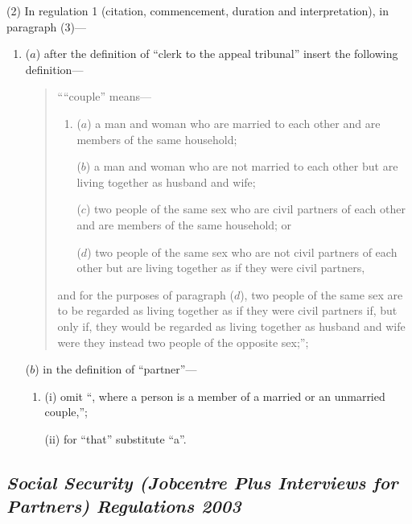 \documentclass[12pt,a4paper]{article}
\begin{document}
(2) In regulation 1 (citation, commencement, duration and interpretation), in paragraph (3)—
\begin{enumerate}\item[]
($a$) after the definition of “clerk to the appeal tribunal” insert the following definition—
\begin{quotation}
““couple” means—
\begin{enumerate}\item[]
($a$) 
a man and woman who are married to each other and are members of the same household;

($b$) 
a man and woman who are not married to each other but are living together as husband and wife;

($c$) 
two people of the same sex who are civil partners of each other and are members of the same household; or

($d$) 
two people of the same sex who are not civil partners of each other but are living together as if they were civil partners,
\end{enumerate}
and for the purposes of paragraph ($d$), two people of the same sex are to be regarded as living together as if they were civil partners if, but only if, they would be regarded as living together as husband and wife were they instead two people of the opposite sex;”;
\end{quotation}

($b$) in the definition of “partner”—
\begin{enumerate}\item[]
(i) omit “, where a person is a member of a married or an unmarried couple,”;

(ii) for “that” substitute “a”.
\end{enumerate}
\end{enumerate}



\subsection*{\itshape Social Security (Jobcentre Plus Interviews for Partners) Regulations 2003}
\end{document}
